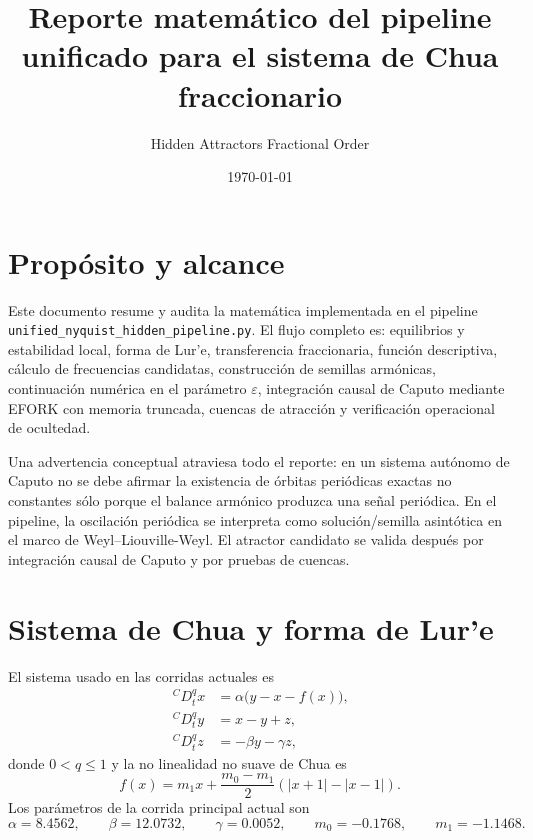 \documentclass[11pt]{article}
\title{Reporte matemático del pipeline unificado para el sistema de Chua fraccionario}
\author{Hidden Attractors Fractional Order}
\date{\today}
\newcommand{\CaputoD}{\,{}^{C}D_t^q}
\begin{document}
\maketitle

\section{Propósito y alcance}

Este documento resume y audita la matemática implementada en el pipeline
\texttt{unified\_nyquist\_hidden\_pipeline.py}. El flujo completo es:
equilibrios y estabilidad local, forma de Lur'e, transferencia fraccionaria,
función descriptiva, cálculo de frecuencias candidatas, construcción de
semillas armónicas, continuación numérica en el parámetro \(\varepsilon\),
integración causal de Caputo mediante EFORK con memoria truncada, cuencas de
atracción y verificación operacional de ocultedad.

Una advertencia conceptual atraviesa todo el reporte: en un sistema autónomo
de Caputo no se debe afirmar la existencia de órbitas periódicas exactas no
constantes sólo porque el balance armónico produzca una señal periódica. En el
pipeline, la oscilación periódica se interpreta como solución/semilla
asintótica en el marco de Weyl--Liouville-Weyl. El atractor candidato se valida
después por integración causal de Caputo y por pruebas de cuencas.

\section{Sistema de Chua y forma de Lur'e}

El sistema usado en las corridas actuales es
\begin{align}
\CaputoD x &= \alpha\bigl(y-x-f(x)\bigr),\\
\CaputoD y &= x-y+z,\\
\CaputoD z &= -\beta y-\gamma z,
\end{align}
donde \(0<q\leq 1\) y la no linealidad no suave de Chua es
\begin{equation}
f(x)=m_1x+\frac{m_0-m_1}{2}\left(|x+1|-|x-1|\right).
\end{equation}
Los parámetros de la corrida principal actual son
\[
\alpha=8.4562,\qquad
\beta=12.0732,\qquad
\gamma=0.0052,\qquad
m_0=-0.1768,\qquad
m_1=-1.1468.
\]
\end{document}
